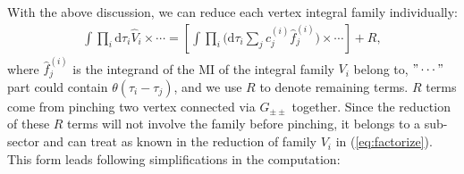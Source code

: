 \documentclass[a4paper,11pt]{article}
\newcommand{\nd}{\mathrm{d}}
\def\eqref#1{(\ref{#1})}
\begin{document}
With the above discussion,  we can reduce each vertex integral family individually: 
\begin{align}
\int \prod_i \nd\tau_i \hat{V}_i    \times \cdots =  \left[ \int \prod_i \Big(\nd\tau_i \sum_j c^{(i)}_j \hat{f}^{(i)}_j  \Big)   \times \cdots \right] + R, \label{eq:factorize}
\end{align}
where $\hat{f}^{(i)}_j$ is the  integrand of the MI of the integral family $V_i$ belong to,   $"\cdots"$ part could contain $\theta(\tau_i-\tau_j)$, and we use $R$ to denote remaining terms. $R$ terms come from pinching two vertex connected via $G_{\pm\pm}$ together. Since the reduction of these $R$ terms will not involve the family before pinching,  it belongs to a sub-sector and can treat as known in the reduction of family $V_i$ in \eqref{eq:factorize}. This form leads  following simplifications in the computation:
\end{document}
